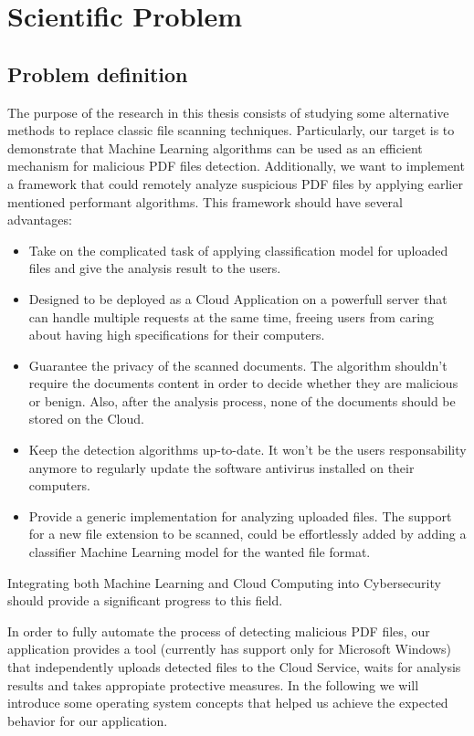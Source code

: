 \chapter{Scientific Problem}
\label{section:scientificProblem}

\section{Problem definition}
\label{section:problemDefinition}
The purpose of the research in this thesis consists of studying some alternative methods to replace classic file scanning techniques. Particularly, our target is to demonstrate that Machine Learning algorithms can be used as an efficient mechanism for malicious PDF files detection. Additionally, we want to implement a framework that could remotely analyze suspicious PDF files by applying earlier mentioned performant algorithms. This framework should have several advantages: 
\begin{itemize}
    \item Take on the complicated task of applying classification model for uploaded files and give the analysis result to the users.
    \item Designed to be deployed as a Cloud Application on a powerfull server that can handle multiple requests at the same time, freeing users from caring about having high specifications for their computers.
    \item Guarantee the privacy of the scanned documents. The algorithm shouldn't require the documents content in order to decide whether they are malicious or benign. Also, after the analysis process, none of the documents should be stored on the Cloud.
    \item Keep the detection algorithms up-to-date. It won't be the users responsability anymore to regularly update the software antivirus installed on their computers. 
    \item Provide a generic implementation for analyzing uploaded files. The support for a new file extension to be scanned, could be effortlessly added by adding a classifier Machine Learning model for the wanted file format.
\end{itemize}
Integrating both Machine Learning and Cloud Computing into Cybersecurity should provide a significant progress to this field. \par

In order to fully automate the process of detecting malicious PDF files, our application provides a tool (currently has support only for Microsoft Windows) that independently uploads detected files to the Cloud Service, waits for analysis results and takes appropiate protective measures. In the following we will introduce some operating system concepts that helped us achieve the expected behavior for our application.

